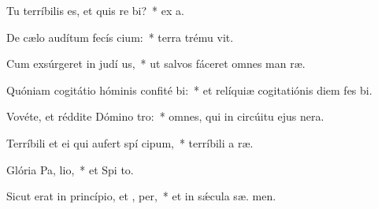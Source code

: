 \item Tu terríbilis es, et quis re bi?~* ex   a.
\item De cælo audítum fecís cium:~* terra trému  vit.
\item Cum exsúrgeret in judí us,~* ut salvos fáceret omnes man ræ.
\item Quóniam cogitátio hóminis confité bi:~* et relíquiæ cogitatiónis diem fes  bi.
\item Vovéte, et réddite Dómino  tro:~* omnes, qui in circúitu ejus  nera.
\item Terríbili et ei qui aufert spí cipum,~* terríbili a  ræ.
\item Glória Pa,  lio,~* et Spi to.
\item Sicut erat in princípio, et ,  per,~* et in sǽcula sæ. men.
